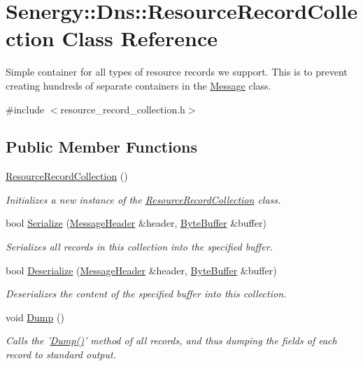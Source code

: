\hypertarget{class_senergy_1_1_dns_1_1_resource_record_collection}{\section{Senergy\-:\-:Dns\-:\-:Resource\-Record\-Collection Class Reference}
\label{class_senergy_1_1_dns_1_1_resource_record_collection}
}


Simple container for all types of resource records we support. This is to prevent creating hundreds of separate containers in the \hyperlink{class_senergy_1_1_dns_1_1_message}{Message} class.  




{\ttfamily \#include $<$resource\-\_\-record\-\_\-collection.\-h$>$}

\subsection*{Public Member Functions}
\begin{DoxyCompactItemize}
\item 
\hyperlink{class_senergy_1_1_dns_1_1_resource_record_collection_a66f740bd63a874374e471973ee236d78}{Resource\-Record\-Collection} ()
\begin{DoxyCompactList}\small\item\em Initializes a new instance of the \hyperlink{class_senergy_1_1_dns_1_1_resource_record_collection}{Resource\-Record\-Collection} class. \end{DoxyCompactList}\item 
bool \hyperlink{class_senergy_1_1_dns_1_1_resource_record_collection_affa4da32b82b69f712c2383ab4f9ee8c}{Serialize} (\hyperlink{class_senergy_1_1_dns_1_1_message_header}{Message\-Header} \&header, \hyperlink{class_senergy_1_1_byte_buffer}{Byte\-Buffer} \&buffer)
\begin{DoxyCompactList}\small\item\em Serializes all records in this collection into the specified buffer. \end{DoxyCompactList}\item 
bool \hyperlink{class_senergy_1_1_dns_1_1_resource_record_collection_ae228f7ec1cf020033f64f68a3f5ea4e1}{Deserialize} (\hyperlink{class_senergy_1_1_dns_1_1_message_header}{Message\-Header} \&header, \hyperlink{class_senergy_1_1_byte_buffer}{Byte\-Buffer} \&buffer)
\begin{DoxyCompactList}\small\item\em Deserializes the content of the specified buffer into this collection. \end{DoxyCompactList}\item 
void \hyperlink{class_senergy_1_1_dns_1_1_resource_record_collection_a62ac608c82f209ec4b0c2ed5bc155a73}{Dump} ()
\begin{DoxyCompactList}\small\item\em Calls the '\hyperlink{class_senergy_1_1_dns_1_1_resource_record_collection_a62ac608c82f209ec4b0c2ed5bc155a73}{Dump()}' method of all records, and thus dumping the fields of each record to standard output. \end{DoxyCompactList}\end{DoxyCompactItemize}
